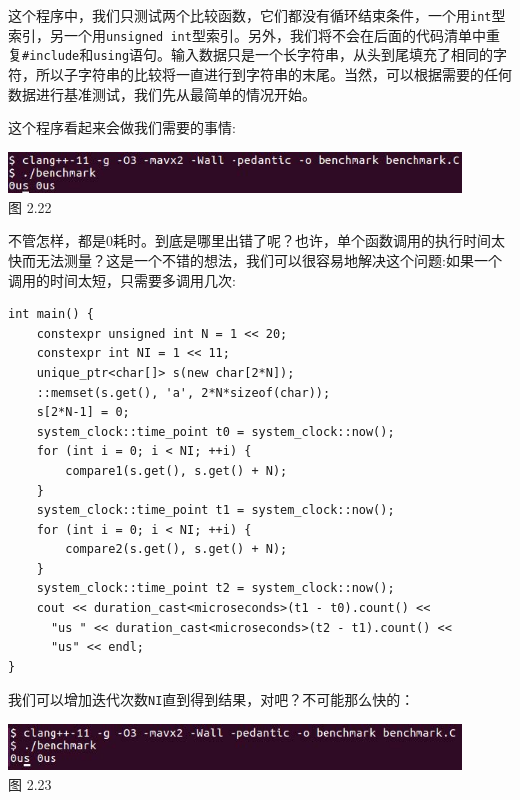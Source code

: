 这个程序中，我们只测试两个比较函数，它们都没有循环结束条件，一个用\texttt{int}型索引，另一个用\texttt{unsigned int}型索引。另外，我们将不会在后面的代码清单中重复\texttt{\#include}和\texttt{using}语句。输入数据只是一个长字符串，从头到尾填充了相同的字符，所以子字符串的比较将一直进行到字符串的末尾。当然，可以根据需要的任何数据进行基准测试，我们先从最简单的情况开始。

这个程序看起来会做我们需要的事情:

\begin{center}
\includegraphics[width=0.9\textwidth]{content/1/chapter2/images/22.jpg}\\
图 2.22
\end{center}

不管怎样，都是0耗时。到底是哪里出错了呢？也许，单个函数调用的执行时间太快而无法测量？这是一个不错的想法，我们可以很容易地解决这个问题:如果一个调用的时间太短，只需要多调用几次:

\begin{lstlisting}[style=styleCXX]
int main() {
	constexpr unsigned int N = 1 << 20;
	constexpr int NI = 1 << 11;
	unique_ptr<char[]> s(new char[2*N]);
	::memset(s.get(), 'a', 2*N*sizeof(char));
	s[2*N-1] = 0;
	system_clock::time_point t0 = system_clock::now();
	for (int i = 0; i < NI; ++i) {
		compare1(s.get(), s.get() + N);
	}
	system_clock::time_point t1 = system_clock::now();
	for (int i = 0; i < NI; ++i) {
		compare2(s.get(), s.get() + N);
	}
	system_clock::time_point t2 = system_clock::now();
	cout << duration_cast<microseconds>(t1 - t0).count() <<
	  "us " << duration_cast<microseconds>(t2 - t1).count() <<
	  "us" << endl;
}
\end{lstlisting}

我们可以增加迭代次数\texttt{NI}直到得到结果，对吧？不可能那么快的：

\begin{center}
\includegraphics[width=0.9\textwidth]{content/1/chapter2/images/23.jpg}\\
图 2.23
\end{center}


